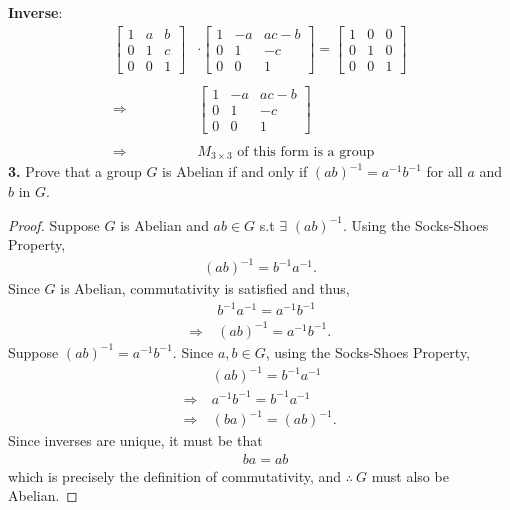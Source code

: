 \documentclass[12pt, letterpaper]{article}
\begin{document}
\indent \textbf{Inverse}:
\begin{align*}
    \left[\begin{array}{ccc}
         1&a&b  \\
         0&1&c \\
         0&0&1
    \end{array}\right] &\cdot \left[\begin{array}{ccc}
         1& -a & ac -b \\
         0& 1 & -c \\
         0 & 0 & 1
    \end{array}\right] = \left[\begin{array}{ccc}
         1& 0 & 0  \\
         0 & 1 & 0 \\
         0 & 0 & 1 
    \end{array}\right] \\ \\
    \Rightarrow \ &\boxed{\left[\begin{array}{ccc}
         1& -a & ac -b \\
         0& 1 & -c \\
         0 & 0 & 1 
    \end{array}\right]} \\ \\
    \Rightarrow \ &\text{$M_{3 \times 3}$ of this form is a group}
\end{align*}
\vspace{0.2em}
\textbf{3.} Prove that a group $G$ is Abelian if and only if $(ab)^{-1} = a^{-1}b^{-1}$ for all $a$ and $b$ in $G$.
\begin{proof}
    Suppose $G$ is Abelian and $ab \in G$ s.t $\exists$ $(ab)^{-1}$. Using the Socks-Shoes Property,
    \begin{align*}
        (ab)^{-1} = b^{-1}a^{-1}.
    \end{align*}
    Since $G$ is Abelian, commutativity is satisfied and thus,
    \begin{align*}
        &b^{-1}a^{-1} = a^{-1}b^{-1} \\
       \Rightarrow \  &(ab)^{-1} = a^{-1}b^{-1}.
    \end{align*}
    Suppose $(ab)^{-1} = a^{-1}b^{-1}$. Since $a,b \in G$, using the Socks-Shoes Property, 
    \begin{align*}
        &(ab)^{-1} = b^{-1}a^{-1} \\
        \Rightarrow \ & a^{-1} b^{-1} = b^{-1}a^{-1} \\
        \Rightarrow \ & (ba)^{-1} = (ab)^{-1}.
    \end{align*}
    Since inverses are unique, it must be that 
    \begin{align*}
         &ba = ab
    \end{align*}
    which is precisely the definition of commutativity, and $\therefore \ G$ must also be Abelian. 
\end{proof}
\end{document}
